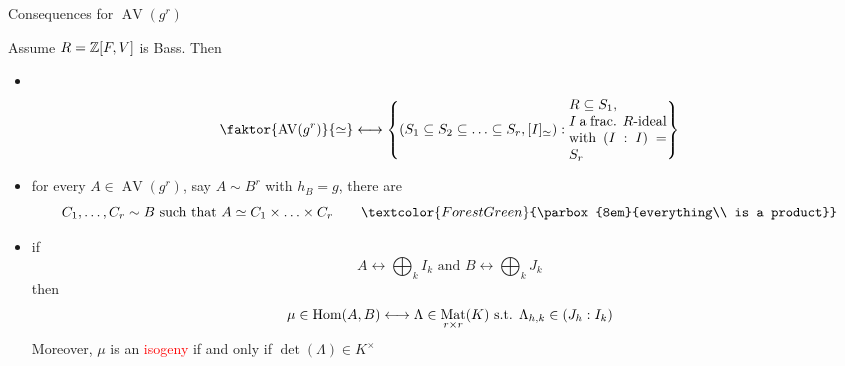 \documentclass[usenames,dvipsnames]{beamer}
\DeclareMathOperator{\AV}{AV}
\DeclareMathOperator{\Mat}{Mat}
\newcommand{\red}[1]{\textcolor{red}{#1}}
\newcommand{\green}[1]{\textcolor{ForestGreen}{#1}}
\begin{document}
\begin{frame}{ Consequences for $\AV(g^r)$ }
\begin{corollary}
Assume $R=\mathbb{Z}[F,V]$ is Bass.
Then
 \begin{itemize}
  \pause \vspace{1em} \item \
  \vspace{-3em}
  \[ \faktor{\AV(g^r)}{ \simeq } \longleftrightarrow \set{ (S_1\subseteq S_2 \subseteq \ldots \subseteq S_r , [I]_{\simeq}) : \parbox{7em}{$R\subseteq S_1$,\\ $I$ a frac. $R$-ideal with $(I:I)=S_r$}  } \]
  \pause \vspace{-1em} \item for every $A\in \AV(g^r)$, say $A\sim B^r$ with $h_B=g$, there are 
  \vspace{-1em}
  \[C_1,\ldots,C_r \sim B \text{ such that } A \simeq C_1\times \ldots \times C_r \qquad\green{\parbox{8em}{everything\\ is a product}} \]
  \vspace{-1em}
  \pause \item if 
  \vspace{-1em}
  \[ A \longleftrightarrow \bigoplus_k I_k \text{ and } B \longleftrightarrow \bigoplus_k J_k \]
  \vspace{-1em}
  then 
  \vspace{-1em}
  \[ \mu \in \Hom(A,B) \longleftrightarrow \Lambda \in \Mat_{r\times r}(K) \text{ s.t. } \Lambda_{h,k}\in (J_h:I_k) \]
  \pause Moreover, $\mu$ is an \red{isogeny} if and only if $\det(\Lambda) \in K^\times$
 \end{itemize}
\end{corollary}
\end{frame}
\end{document}
